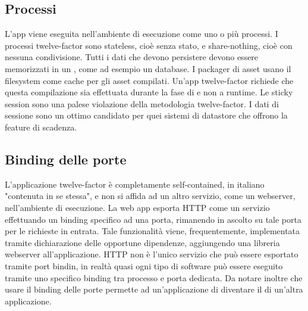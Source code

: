 \documentclass[NormeDiProgetto.tex]{subfiles}
\begin{document}
\subsection{Processi}
L'app viene eseguita nell'ambiente di esecuzione come uno o più processi. I processi twelve-factor sono stateless, cioè senza stato, e share-nothing, cioè con nessuna condivisione. Tutti i dati che devono persistere devono essere memorizzati in un , come ad esempio un database.
I packager di asset usano il filesystem come cache per gli asset compilati. Un'app twelve-factor richiede che questa compilazione sia effettuata durante la fase di  e non a runtime.
Le sticky session sono una palese violazione della metodologia twelve-factor. I dati di sessione sono un ottimo candidato per quei sistemi di datastore che offrono la feature di scadenza.

\subsection{Binding delle porte}
L'applicazione twelve-factor è completamente self-contained, in italiano "contenuta in se stessa", e non si affida ad un altro servizio, come un webserver, nell'ambiente di esecuzione. La web app esporta HTTP come un servizio effettuando un binding specifico ad una porta, rimanendo in ascolto su tale porta per le richieste in entrata. Tale funzionalità viene, frequentemente, implementata tramite dichiarazione delle opportune dipendenze, aggiungendo una libreria webserver all'applicazione.
HTTP non è l'unico servizio che può essere esportato tramite port bindin, in realtà quasi ogni tipo di software può essere eseguito tramite uno specifico binding tra processo e porta dedicata.
Da notare inoltre che usare il binding delle porte permette ad un'applicazione di diventare il  di un'altra applicazione.
\end{document}

